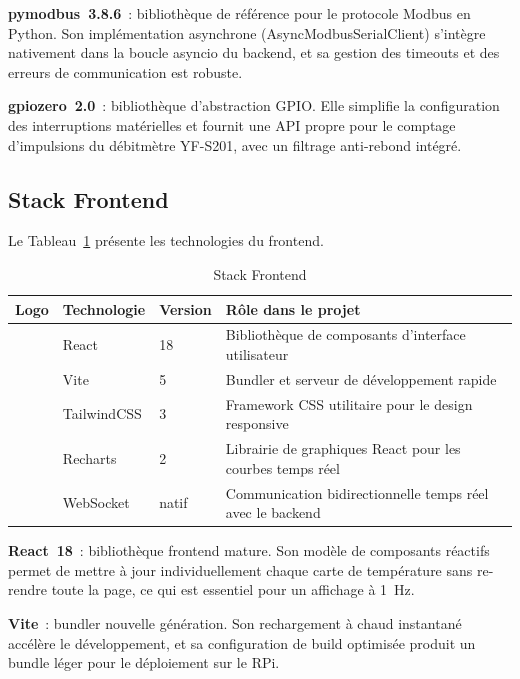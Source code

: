 \textbf{pymodbus~3.8.6}~: bibliothèque de référence pour le protocole Modbus en Python. Son implémentation asynchrone (AsyncModbusSerialClient) s'intègre nativement dans la boucle asyncio du backend, et sa gestion des timeouts et des erreurs de communication est robuste.

\textbf{gpiozero~2.0}~: bibliothèque d'abstraction GPIO. Elle simplifie la configuration des interruptions matérielles et fournit une API propre pour le comptage d'impulsions du débitmètre YF-S201, avec un filtrage anti-rebond intégré.

\subsection{Stack Frontend}

Le Tableau~\ref{tab:stack_frontend} présente les technologies du frontend.

\begin{table}[htbp]
\centering
\caption{Stack Frontend}
\label{tab:stack_frontend}
\begin{tabular}{c p{} p{} p{}}
\toprule
\textbf{Logo} & \textbf{Technologie} & \textbf{Version} & \textbf{Rôle dans le projet} \\
\midrule
\fbox{\parbox[c][0.6cm][c]{0.6cm}{\centering\tiny [Rct]}} & React & 18 & Bibliothèque de composants d'interface utilisateur \\
\fbox{\parbox[c][0.6cm][c]{0.6cm}{\centering\tiny [Vi]}} & Vite & 5 & Bundler et serveur de développement rapide \\
\fbox{\parbox[c][0.6cm][c]{0.6cm}{\centering\tiny [TW]}} & TailwindCSS & 3 & Framework CSS utilitaire pour le design responsive \\
\fbox{\parbox[c][0.6cm][c]{0.6cm}{\centering\tiny [Rch]}} & Recharts & 2 & Librairie de graphiques React pour les courbes temps réel \\
\fbox{\parbox[c][0.6cm][c]{0.6cm}{\centering\tiny [WS]}} & WebSocket & natif & Communication bidirectionnelle temps réel avec le backend \\
\bottomrule
\end{tabular}
\end{table}

\textbf{React~18}~: bibliothèque frontend mature. Son modèle de composants réactifs permet de mettre à jour individuellement chaque carte de température sans re-rendre toute la page, ce qui est essentiel pour un affichage à 1~Hz.

\textbf{Vite}~: bundler nouvelle génération. Son rechargement à chaud instantané accélère le développement, et sa configuration de build optimisée produit un bundle léger pour le déploiement sur le RPi.


